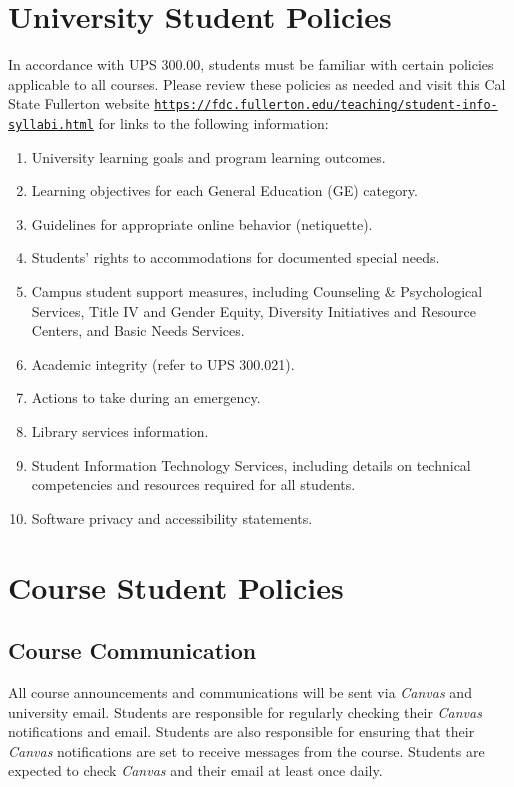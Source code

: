 \documentclass[12pt, letterpaper]{article}
\begin{document}
\section{University Student Policies}

In accordance with UPS 300.00, students must be familiar with certain policies applicable to all courses. Please review these policies as needed and visit this Cal State Fullerton website \texttt{\href{https://fdc.fullerton.edu/teaching/student-info-syllabi.html}{https://fdc.fullerton.edu/teaching/student-info-syllabi.html}} for links to the following information:

\begin{enumerate}
    \item   University learning goals and program learning outcomes.
    \item	Learning objectives for each General Education (GE) category.
    \item	Guidelines for appropriate online behavior (netiquette).
    \item	Students' rights to accommodations for documented special needs.
    \item   Campus student support measures, including Counseling \& Psychological Services, Title IV and Gender Equity, Diversity Initiatives and Resource Centers, and Basic Needs Services.
    \item	Academic integrity (refer to UPS 300.021).
    \item	Actions to take during an emergency.
    \item	Library services information.
    \item	Student Information Technology Services, including details on technical competencies and resources required for all students.
    \item	Software privacy and accessibility statements.
\end{enumerate}

\section{Course Student Policies}

\subsection*{Course Communication}
All course announcements and communications will be sent via \emph{Canvas} and university email. Students are responsible for regularly checking their \emph{Canvas} notifications and email. Students are also responsible for ensuring that their \emph{Canvas} notifications are set to receive messages from the course. Students are expected to check \emph{Canvas} and their email at least once daily.
\end{document}
